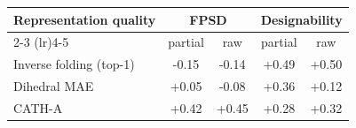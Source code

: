 \begin{tabular}{l cc cc}
\toprule
\textbf{Representation quality} & \multicolumn{2}{c}{\textbf{FPSD}} & \multicolumn{2}{c}{\textbf{Designability}} \\
\cmidrule(lr){2-3} \cmidrule(lr){4-5}
 & partial & raw & partial & raw \\
\midrule
Inverse folding (top-1) & -0.15 & -0.14 & +0.49 & +0.50 \\
Dihedral MAE & +0.05 & -0.08 & +0.36 & +0.12 \\
CATH-A & +0.42 & +0.45 & +0.28 & +0.32 \\
\bottomrule
\end{tabular}

